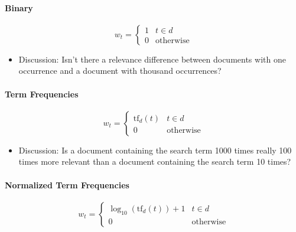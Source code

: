             \paragraph{Binary} %
                \begin{equation*}
                    w_t =
                    	\begin{cases}
	                    	1 & t \in d \\
	                    	0 & \text{otherwise}
                    	\end{cases}
                \end{equation*}
                
                \begin{itemize}
                	\item Discussion: Isn't there a relevance difference between documents with one occurrence and a document with thousand occurrences?
                \end{itemize}

            \paragraph{Term Frequencies} %
                \begin{equation*}
                    w_t =
                    	\begin{cases}
	                    	\text{tf}_d(t) & t \in d \\
	                    	0 & \text{otherwise}
                    	\end{cases}
                \end{equation*}
                
                \begin{itemize}
                	\item Discussion: Is a document containing the search term 1000 times really 100 times more relevant than a document containing the search term 10 times?
                \end{itemize}

            \paragraph{Normalized Term Frequencies} %
                \begin{equation*}
                    w_t =
                    	\begin{cases}
	                    	\log_{10}(\text{tf}_d(t)) + 1 & t \in d \\
	                    	0 & \text{otherwise}
                    	\end{cases}
                \end{equation*}
                
